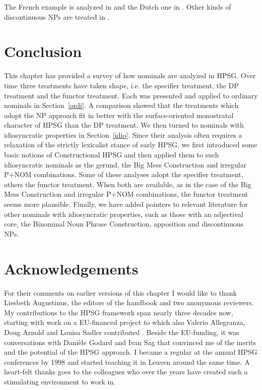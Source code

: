 \documentclass[output=paper
                ,modfonts
                ,nonflat
	        ,collection
	        ,collectionchapter
	        ,collectiontoclongg
 	        ,biblatex
                ,babelshorthands
                ,newtxmath
                ,draftmode
                ,colorlinks, citecolor=brown
]{./langsci/langscibook}
\begin{document}
\noindent
The French example is analyzed in \citet[20--21]{Abeilleetal04} and the Dutch one in 
\citet[47--50]{VanEynde04}. Other kinds of discontinuous NPs are treated in \citet{deKuthy2002a}. 


\section{Conclusion} 


This chapter has provided a survey of how nominals are analyzed in HPSG. 
Over time three treatments have taken shape, i.e. the specifier treatment, 
the DP treatment and the functor treatment. 
Each was presented and applied to ordinary nominals in Section~\ref{ordi}. 
A comparison showed that the treatments which adopt the NP approach fit in better with 
the surface-oriented monostratal character of HPSG than the DP treatment.
We then turned to nominals with idiosyncratic properties in Section~\ref{idio}.
Since their analysis often requires a relaxation of the strictly lexicalist stance of early HPSG, 
we first introduced some basic notions of Constructional HPSG and then applied them to 
such idiosyncratic nominals as the gerund, the Big Mess Construction and irregular P+NOM combinations.  
Some of these analyses adopt the specifier treatment, others the functor treatment. 
When both are available, as in the case of the Big Mess Construction and  
irregular P+NOM combinations, the functor treatment seems more plausible. 
Finally, we have added pointers to relevant literature for other nominals with idiosyncratic properties,
such as those with an adjectival core, the Binominal Noun Phrase Construction, apposition 
and discontinuous NPs. 

 
\section*{Acknowledgements}


For their comments on earlier versions of this chapter I would like to thank 
Liesbeth Augustinus, the editors of the handbook and two anonymous reviewers. 
My contributions to the HPSG framework span nearly three decades now, 
starting with work on a EU-financed project to which
also Valerio Allegranza, Doug Arnold and Louisa Sadler contributed \citep{VanEyndeSchmidt98}. 
Beside the EU-funding, it was conversations with Dani\`ele Godard and Ivan Sag that convinced me 
of the merits and the potential of the HPSG approach.  
I became a regular at the annual HPSG conferences by 1998 and started teaching it in Leuven around 
the same time. A heart-felt thanks goes to the colleagues who over the years have created such a stimulating
environment to work in.        

{\sloppy
\printbibliography[heading=subbibliography,notkeyword=this] 
}
\end{document}
